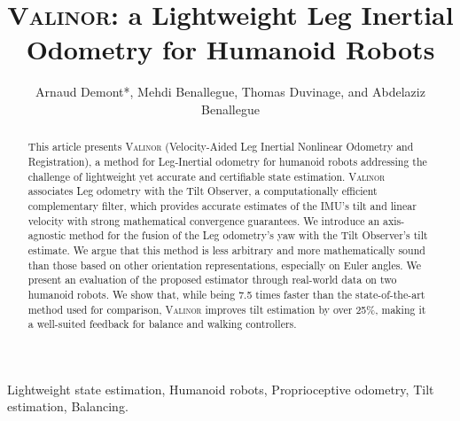 \documentclass{IJCAS}
\begin{document}
\newcommand{\getErrorResult}[5]{\csname#1#2#3#4#5\endcsname}



\title{{\scshape Valinor}: a Lightweight Leg Inertial Odometry for Humanoid Robots}

\author{Arnaud Demont*, Mehdi Benallegue, Thomas Duvinage, and Abdelaziz Benallegue}


\begin{abstract}
This article presents {\scshape Valinor} (Velocity-Aided Leg Inertial Nonlinear Odometry and Registration), a method for Leg-Inertial odometry for humanoid robots addressing the challenge of lightweight yet accurate and certifiable state estimation. {\scshape Valinor} associates Leg odometry with the Tilt Observer, a computationally efficient complementary filter, which provides accurate estimates of the IMU's tilt and linear velocity with strong mathematical convergence guarantees. We introduce an axis-agnostic method for the fusion of the Leg odometry's yaw with the Tilt Observer's tilt estimate. We argue that this method is less arbitrary and more mathematically sound than those based on other orientation representations, especially on Euler angles.
We present an evaluation of the proposed estimator through real-world data on two humanoid robots. We show that, while being 7.5 times faster than the state-of-the-art method used for comparison, {\scshape Valinor} improves tilt estimation by over 25\%, making it a well-suited feedback for balance and walking controllers. 
\end{abstract}

\begin{keywords}
  Lightweight state estimation, Humanoid robots, Proprioceptive odometry, Tilt estimation, Balancing.
\end{keywords}

\maketitle


\end{document}
